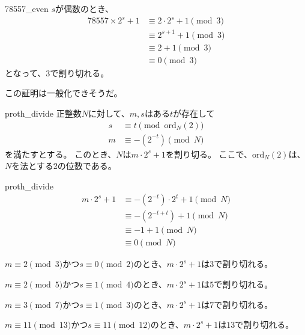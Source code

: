 \begin{prProof}{78557_even}
$s$が偶数のとき、
\begin{align*}
78557\times 2^s+1 &\equiv 2 \cdot 2^s + 1 \pmod{3}\\
&\equiv 2^{s+1} + 1 \pmod{3}\\
&\equiv 2 + 1 \pmod{3}\\
&\equiv 0 \pmod{3}
\end{align*}
となって、3で割り切れる。
\end{prProof}

この証明は一般化できそうだ。

\begin{Prop}{}{proth_divide}
正整数$N$に対して、$m,s$はある$t$が存在して
\begin{align*}
s &\equiv t \pmod{\mbox{ord}_N(2)}\\
m &\equiv -(2^{-t}) \pmod{N}
\end{align*}
を満たすとする。
このとき、$N$は$m\cdot2^s+1$を割り切る。
ここで、$\mbox{ord}_N(2)$は、$N$を法とする2の位数である。
\end{Prop}

\begin{prProof}{proth_divide}
\begin{align*}
m\cdot 2^s+1 &\equiv -(2^{-t}) \cdot 2^t + 1 \pmod{N}\\
&\equiv -(2^{-t+t}) + 1 \pmod{N}\\
&\equiv -1 + 1 \pmod{N}\\
&\equiv 0 \pmod{N}
\end{align*}
\end{prProof}

\begin{Coro}{}{}
$m\equiv2\pmod{3}$かつ$s\equiv0\pmod{2}$のとき、$m\cdot 2^s+1$は$3$で割り切れる。
\end{Coro}

\begin{Coro}{}{}
$m\equiv2\pmod{5}$かつ$s\equiv1\pmod{4}$のとき、$m\cdot 2^s+1$は$5$で割り切れる。
\end{Coro}

\begin{Coro}{}{}
$m\equiv3\pmod{7}$かつ$s\equiv1\pmod{3}$のとき、$m\cdot 2^s+1$は$7$で割り切れる。
\end{Coro}

\begin{Coro}{}{}
$m\equiv11\pmod{13}$かつ$s\equiv11\pmod{12}$のとき、$m\cdot 2^s+1$は$13$で割り切れる。
\end{Coro}

